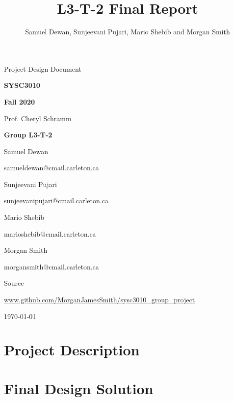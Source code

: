 \documentclass[11pt,letterpaper]{article}
\title{L3-T-2 Final Report}
\author{Samuel Dewan, Sunjeevani Pujari, Mario Shebib and Morgan Smith}
\let\Oldsection\section
\renewcommand{\section}{\FloatBarrier\Oldsection}
\begin{document}
\frenchspacing

\begin{titlepage}
\centering


{\Huge \sffamily Project Design Document}

{\large \textbf{SYSC3010}}

{\large \textbf{Fall 2020}}

Prof. Cheryl Schramm


{\large \textbf{Group L3-T-2}}

Samuel Dewan

{\footnotesize samueldewan@cmail.carleton.ca}

Sunjeevani Pujari

{\footnotesize sunjeevanipujari@cmail.carleton.ca}

Mario Shebib

{\footnotesize marioshebib@cmail.carleton.ca}

Morgan Smith

{\footnotesize morgansmith@cmail.carleton.ca}


Source

{\footnotesize \url{www.github.com/MorganJamesSmith/sysc3010\_group\_project}}


{\large \today}


\end{titlepage}

\tableofcontents
\clearpage
{}

\section{Project Description}
\label{sec:project-description}

\clearpage

\section{Final Design Solution}
\label{sec:final-design-solution}

\clearpage
\end{document}
